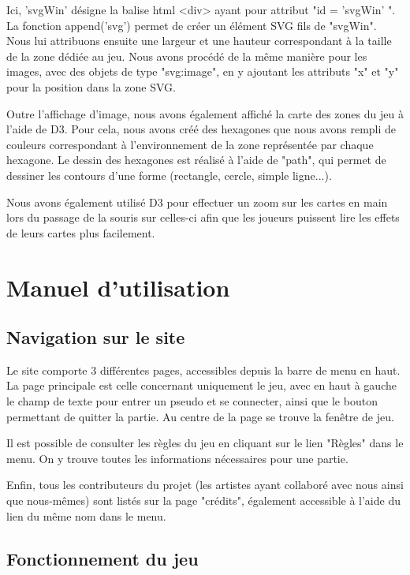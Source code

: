 \documentclass[12pt]{report}
\begin{document}
        Ici, 'svgWin' désigne la balise html <div> ayant pour attribut "id = 'svgWin' ". La fonction append('svg') permet de créer un élément SVG fils de "svgWin". Nous lui attribuons ensuite une largeur et une hauteur correspondant à la taille de la zone dédiée au jeu. Nous avons procédé de la même manière pour les images, avec des objets de type "svg:image", en y ajoutant les attributs "x" et "y" pour la position dans la zone SVG.

        Outre l'affichage d'image, nous avons également affiché la carte des zones du jeu à l'aide de D3. Pour cela, nous avons créé des hexagones que nous avons rempli de couleurs correspondant à l'environnement de la zone représentée par chaque hexagone. Le dessin des hexagones est réalisé à l'aide de "path", qui permet de dessiner les contours d'une forme (rectangle, cercle, simple ligne...).

        Nous avons également utilisé D3 pour effectuer un zoom sur les cartes en main lors du passage de la souris sur celles-ci afin que les joueurs puissent lire les effets de leurs cartes plus facilement.


\chapter{Manuel d'utilisation}

    \section{Navigation sur le site}

    Le site comporte 3 différentes pages, accessibles depuis la barre de menu en haut. La page principale est celle concernant uniquement le jeu, avec en haut à gauche le champ de texte pour entrer un pseudo et se connecter, ainsi que le bouton permettant de quitter la partie. Au centre de la page se trouve la fenêtre de jeu.

    Il est possible de consulter les règles du jeu en cliquant sur le lien "Règles" dans le menu. On y trouve toutes les informations nécessaires pour une partie.

    Enfin, tous les contributeurs du projet (les artistes ayant collaboré avec nous ainsi que nous-mêmes) sont listés sur la page "crédits", également accessible à l'aide du lien du même nom dans le menu.

    \section{Fonctionnement du jeu}
\end{document}
